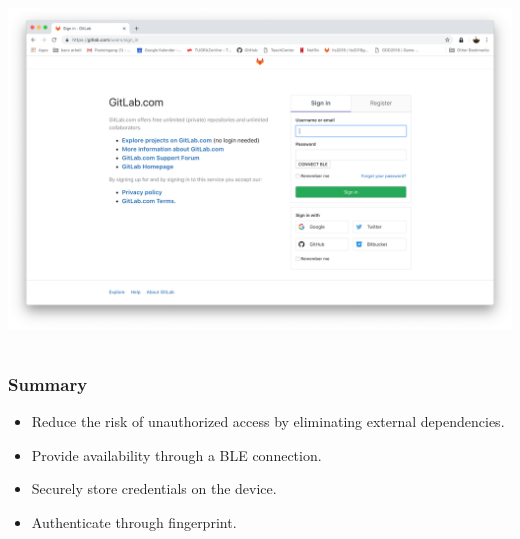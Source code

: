 \documentclass{beamer}
\begin{document}
\begin{frame}{}
\vfill
\centering
\includegraphics[width=\textwidth]{images/web.png}
\vfill
\end{frame}

\section{}
\begin{frame}\frametitle{Summary}
\begin{itemize}
	\item Reduce the risk of unauthorized access by eliminating external dependencies.
	\item Provide availability through a BLE connection.
	\item Securely store credentials on the device.
	\item Authenticate through fingerprint.
\end{itemize}
\end{frame}


\end{document}
